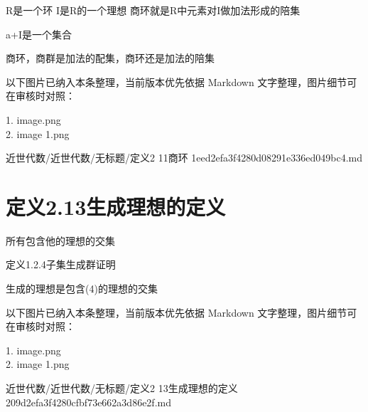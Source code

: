 \begin{definition}[定义2.11商环]

R是一个环 I是R的一个理想 商环就是R中元素对I做加法形成的陪集

a+I是一个集合

商环，商群是加法的配集，商环还是加法的陪集

\end{definition}

\begin{note}[关联图片]
以下图片已纳入本条整理，当前版本优先依据 Markdown 文字整理，图片细节可在审核时对照：

1. image.png\\
2. image 1.png\\

\end{note}

\begin{note}[来源路径]

近世代数/近世代数/无标题/定义2 11商环 1eed2efa3f4280d08291e336ed049bc4.md

\end{note}

\section*{定义2.13生成理想的定义}

\begin{definition}[定义2.13生成理想的定义]

所有包含他的理想的交集

定义1.2.4子集生成群证明

生成的理想是包含(4)的理想的交集

\end{definition}

\begin{note}[关联图片]
以下图片已纳入本条整理，当前版本优先依据 Markdown 文字整理，图片细节可在审核时对照：

1. image.png\\
2. image 1.png\\

\end{note}

\begin{note}[来源路径]

近世代数/近世代数/无标题/定义2 13生成理想的定义 209d2efa3f4280cfbf73e662a3d86e2f.md

\end{note}

